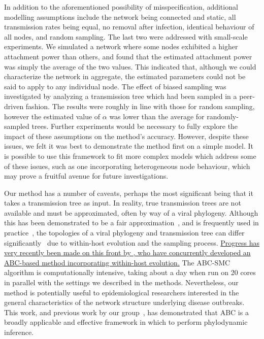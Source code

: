 \documentclass[12pt]{article}\usepackage[]{graphicx}\usepackage[]{color}
\newcommand{\add}[1]{\color{blue} \uline{#1} \color{black}}
\begin{document}
In addition to the aforementioned possibility of misspecification, additional
modelling assumptions include the network being connected and static, all
transmission rates being equal, no removal after infection, identical behaviour
of all nodes, and random sampling. The last two were addressed with small-scale
experiments. We simulated a network where some nodes exhibited a higher
attachment power than others, and found that the estimated attachment power was
simply the average of the two values. This indicated that, although we could
characterize the network in aggregate, the estimated parameters could not be
said to apply to any individual node. The effect of biased sampling was
investigated by analyzing a transmission tree which had been sampled in a
peer-driven fashion. The results were roughly in line with those for random
sampling, however the estimated value of $\alpha$ was lower than the average
for randomly-sampled trees. Further experiments would be necessary to fully
explore the impact of these assumptions on the method's accuracy. However,
despite these issues, we felt it was best to demonstrate the method first on a
simple model. It is possible to use this framework to fit more complex models
which address some of these issues, such as one incorporating heterogeneous
node behaviour, which may prove a fruitful avenue
for future investigations.

Our method has a number of caveats, perhaps the most significant being that it
takes a transmission tree as input. In reality, true transmission trees are not
available and must be approximated, often by way of a viral phylogeny. Although
this has been demonstrated to be a fair
approximation~\autocite[e.g.][]{leitner1996accurate}, and is frequently used in
practice~\autocite[e.g.][]{stadler2013uncovering}, the topologies of a viral
phylogeny and transmission tree can differ
significantly~\autocite{ypma2013relating} due to within-host evolution and the
sampling process. \add{Progress has very recently been made on this front by
\textcite{giardina2016inference}, who have concurrently developed an ABC-based
method incorporating within-host evolution.} The ABC-SMC algorithm is
computationally intensive, taking about a day when run on 20 cores in parallel
with the settings we described in the methods. Nevertheless, our method is
potentially useful to epidemiological researchers interested in the general
characteristics of the network structure underlying disease outbreaks. This
work, and previous work by our group~\autocite{poon2015phylodynamic}, has
demonstrated that ABC is a broadly applicable and effective framework in which
to perform phylodynamic inference.
\end{document}
